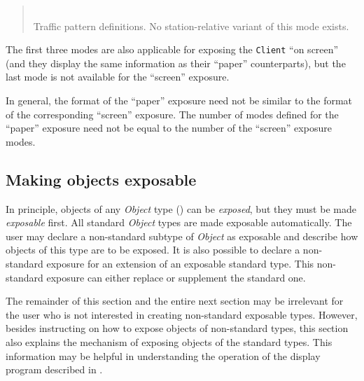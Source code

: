 \begin{quote}
\noindent{}\\ \hspace{0in}
Traffic pattern definitions.
No station-relative variant of this mode exists.
\end{quote}\medskip

The first three modes are also applicable
for exposing the {\tt Client} ``on screen''
(and they display the same information as their ``paper'' counterparts),
but the last mode is not available for the ``screen'' exposure.

In general, the format of the ``paper'' exposure need not be
similar to the format of the corresponding ``screen'' exposure.
The number of modes defined for the ``paper'' exposure need not be equal
to the number of the ``screen'' exposure modes.

\subsection{Making objects exposable}
\label{rm_ex_mo}

In principle, objects of any {\em Object\/} type ()
can be {\em exposed}, but they must be made {\em exposable\/} first.
All standard {\em Object\/} types are made exposable automatically.
The user
may declare a non-standard subtype of {\em Object\/} as exposable and describe
how objects of this type are to be exposed.
It is also possible to declare a non-standard exposure for an extension of
an exposable standard type.
This non-standard exposure can either replace or supplement the standard one.

The remainder of this section and the entire next section
may be irrelevant for the user who is not interested
in creating non-standard exposable types.
However, besides instructing on how to expose objects of non-standard types,
this section
also explains the mechanism of exposing objects of the standard types.
This information may be helpful in understanding the operation of the
display program described in .

